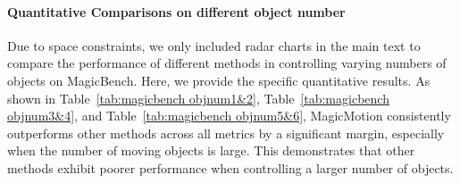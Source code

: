 \paragraph{Quantitative Comparisons on different object number}
Due to space constraints, we only included radar charts in the main text to compare the performance of different methods in controlling varying numbers of objects on MagicBench. Here, we provide the specific quantitative results. As shown in Table~\ref{tab:magicbench objnum1&2}, Table~\ref{tab:magicbench objnum3&4}, and Table~\ref{tab:magicbench objnum5&6}, MagicMotion consistently outperforms other methods across all metrics by a significant margin, especially when the number of moving objects is large. This demonstrates that other methods exhibit poorer performance when controlling a larger number of objects.

